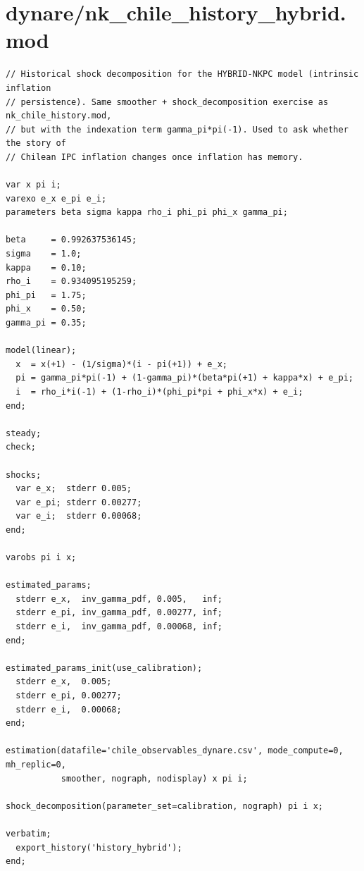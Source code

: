 \documentclass[9pt]{extarticle}
\begin{document}
\section{dynare/nk\_chile\_history\_hybrid.mod}
\begin{lstlisting}[language={}]
// Historical shock decomposition for the HYBRID-NKPC model (intrinsic inflation
// persistence). Same smoother + shock_decomposition exercise as nk_chile_history.mod,
// but with the indexation term gamma_pi*pi(-1). Used to ask whether the story of
// Chilean IPC inflation changes once inflation has memory.

var x pi i;
varexo e_x e_pi e_i;
parameters beta sigma kappa rho_i phi_pi phi_x gamma_pi;

beta     = 0.992637536145;
sigma    = 1.0;
kappa    = 0.10;
rho_i    = 0.934095195259;
phi_pi   = 1.75;
phi_x    = 0.50;
gamma_pi = 0.35;

model(linear);
  x  = x(+1) - (1/sigma)*(i - pi(+1)) + e_x;
  pi = gamma_pi*pi(-1) + (1-gamma_pi)*(beta*pi(+1) + kappa*x) + e_pi;
  i  = rho_i*i(-1) + (1-rho_i)*(phi_pi*pi + phi_x*x) + e_i;
end;

steady;
check;

shocks;
  var e_x;  stderr 0.005;
  var e_pi; stderr 0.00277;
  var e_i;  stderr 0.00068;
end;

varobs pi i x;

estimated_params;
  stderr e_x,  inv_gamma_pdf, 0.005,   inf;
  stderr e_pi, inv_gamma_pdf, 0.00277, inf;
  stderr e_i,  inv_gamma_pdf, 0.00068, inf;
end;

estimated_params_init(use_calibration);
  stderr e_x,  0.005;
  stderr e_pi, 0.00277;
  stderr e_i,  0.00068;
end;

estimation(datafile='chile_observables_dynare.csv', mode_compute=0, mh_replic=0,
           smoother, nograph, nodisplay) x pi i;

shock_decomposition(parameter_set=calibration, nograph) pi i x;

verbatim;
  export_history('history_hybrid');
end;
\end{lstlisting}
\clearpage
\end{document}
